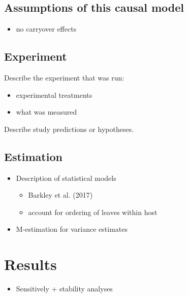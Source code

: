 \documentclass[]{article}
\providecommand{\tightlist}{%
  \setlength{\itemsep}{0pt}\setlength{\parskip}{0pt}}
\begin{document}
\hypertarget{assumptions-of-this-causal-model}{%
\subsection{Assumptions of this causal
model}\label{assumptions-of-this-causal-model}}

\begin{itemize}
\tightlist
\item
  no carryover effects
\end{itemize}

\hypertarget{experiment}{%
\subsection{Experiment}\label{experiment}}

Describe the experiment that was run:

\begin{itemize}
\tightlist
\item
  experimental treatments
\item
  what was measured
\end{itemize}

Describe study predictions or hypotheses.

\hypertarget{estimation}{%
\subsection{Estimation}\label{estimation}}

\begin{itemize}
\tightlist
\item
  Description of statistical models

  \begin{itemize}
  \tightlist
  \item
    Barkley et al. (2017)
  \item
    account for ordering of leaves within host
  \end{itemize}
\item
  M-estimation for variance estimates
\end{itemize}

\hypertarget{results}{%
\section{Results}\label{results}}

\begin{itemize}
\tightlist
\item
  Sensitively + stability analyses
\end{itemize}
\end{document}
